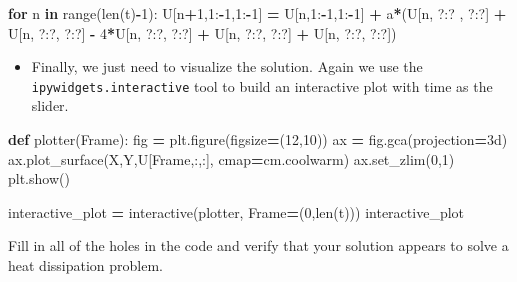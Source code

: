 \documentclass[
]{book}
\newenvironment{Shaded}{\begin{snugshade}}{\end{snugshade}}
\newcommand{\BuiltInTok}[1]{#1}
\newcommand{\ControlFlowTok}[1]{\textcolor[rgb]{0.13,0.29,0.53}{\textbf{#1}}}
\newcommand{\DecValTok}[1]{\textcolor[rgb]{0.00,0.00,0.81}{#1}}
\newcommand{\KeywordTok}[1]{\textcolor[rgb]{0.13,0.29,0.53}{\textbf{#1}}}
\newcommand{\NormalTok}[1]{#1}
\newcommand{\OperatorTok}[1]{\textcolor[rgb]{0.81,0.36,0.00}{\textbf{#1}}}
\newcommand{\StringTok}[1]{\textcolor[rgb]{0.31,0.60,0.02}{#1}}
\providecommand{\tightlist}{%
  \setlength{\itemsep}{0pt}\setlength{\parskip}{0pt}}
\theoremstyle{definition}
\theoremstyle{definition}
\theoremstyle{definition}
\theoremstyle{remark}
\begin{document}
\begin{Shaded}
\begin{Highlighting}[]
\ControlFlowTok{for}\NormalTok{ n }\KeywordTok{in} \BuiltInTok{range}\NormalTok{(}\BuiltInTok{len}\NormalTok{(t)}\OperatorTok{{-}}\DecValTok{1}\NormalTok{):}
\NormalTok{  U[n}\OperatorTok{+}\DecValTok{1}\NormalTok{,}\DecValTok{1}\NormalTok{:}\OperatorTok{{-}}\DecValTok{1}\NormalTok{,}\DecValTok{1}\NormalTok{:}\OperatorTok{{-}}\DecValTok{1}\NormalTok{] }\OperatorTok{=}\NormalTok{ U[n,}\DecValTok{1}\NormalTok{:}\OperatorTok{{-}}\DecValTok{1}\NormalTok{,}\DecValTok{1}\NormalTok{:}\OperatorTok{{-}}\DecValTok{1}\NormalTok{] }\OperatorTok{+} 
\NormalTok{    a}\OperatorTok{*}\NormalTok{(U[n, ?:? , ?:?] }\OperatorTok{+}\NormalTok{ U[n, ?:?, ?:?] }\OperatorTok{{-}} \DecValTok{4}\OperatorTok{*}\NormalTok{U[n, ?:?, ?:?] }\OperatorTok{+}\NormalTok{ U[n, ?:?, ?:?] }\OperatorTok{+}\NormalTok{ U[n, ?:?, ?:?])}
\end{Highlighting}
\end{Shaded}

\begin{itemize}
\tightlist
\item
  Finally, we just need to visualize the solution. Again we use the \texttt{ipywidgets.interactive} tool to build an interactive plot with time as the slider.
\end{itemize}

\begin{Shaded}
\begin{Highlighting}[]
\KeywordTok{def}\NormalTok{ plotter(Frame):}
\NormalTok{  fig }\OperatorTok{=}\NormalTok{ plt.figure(figsize}\OperatorTok{=}\NormalTok{(}\DecValTok{12}\NormalTok{,}\DecValTok{10}\NormalTok{))}
\NormalTok{  ax }\OperatorTok{=}\NormalTok{ fig.gca(projection}\OperatorTok{=}\StringTok{\textquotesingle{}3d\textquotesingle{}}\NormalTok{)}
\NormalTok{  ax.plot\_surface(X,Y,U[Frame,:,:], cmap}\OperatorTok{=}\NormalTok{cm.coolwarm)}
\NormalTok{  ax.set\_zlim(}\DecValTok{0}\NormalTok{,}\DecValTok{1}\NormalTok{)}
\NormalTok{  plt.show()}

\NormalTok{interactive\_plot }\OperatorTok{=}\NormalTok{ interactive(plotter, Frame}\OperatorTok{=}\NormalTok{(}\DecValTok{0}\NormalTok{,}\BuiltInTok{len}\NormalTok{(t)))}
\NormalTok{interactive\_plot}
\end{Highlighting}
\end{Shaded}

Fill in all of the holes in the code and verify that your solution appears to solve a heat dissipation problem.
\end{document}
